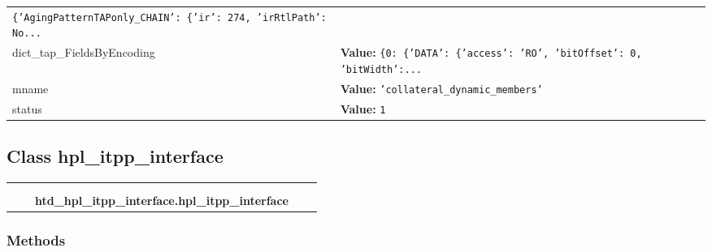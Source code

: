 \begin{longtable}{|p{\varnamewidth}|p{\vardescrwidth}|l}
{\tt \texttt{\{}\texttt{'}\texttt{AgingPatternTAPonly\_CHAIN}\texttt{'}\texttt{: }\texttt{\{}\texttt{'}\texttt{ir}\texttt{'}\texttt{: }274\texttt{, }\texttt{'}\texttt{irRtlPath}\texttt{'}\texttt{: }No\texttt{...}}&\\
\cline{1-2}
\raggedright d\-i\-c\-t\-\_\-t\-a\-p\-\_\-F\-i\-e\-l\-d\-s\-B\-y\-E\-n\-c\-o\-d\-i\-n\-g\- & \raggedright \textbf{Value:} 
{\tt \texttt{\{}0\texttt{: }\texttt{\{}\texttt{'}\texttt{DATA}\texttt{'}\texttt{: }\texttt{\{}\texttt{'}\texttt{access}\texttt{'}\texttt{: }\texttt{'}\texttt{RO}\texttt{'}\texttt{, }\texttt{'}\texttt{bitOffset}\texttt{'}\texttt{: }0\texttt{, }\texttt{'}\texttt{bitWidth}\texttt{'}\texttt{:}\texttt{...}}&\\
\cline{1-2}
\raggedright m\-n\-a\-m\-e\- & \raggedright \textbf{Value:} 
{\tt \texttt{'}\texttt{collateral\_dynamic\_members}\texttt{'}}&\\
\cline{1-2}
\raggedright s\-t\-a\-t\-u\-s\- & \raggedright \textbf{Value:} 
{\tt 1}&\\
\cline{1-2}
\end{longtable}



\subsection{Class hpl\_itpp\_interface}

    \label{htd_hpl_itpp_interface:hpl_itpp_interface}
\begin{tabular}{cccccc}
\multicolumn{2}{r}{\settowidth{\BCL}{object}\multirow{2}{\BCL}{object}}
&&
  \\\cline{3-3}
  &&\multicolumn{1}{c|}{}
&&
  \\
&&\multicolumn{2}{l}{\textbf{htd\_hpl\_itpp\_interface.hpl\_itpp\_interface}}
\end{tabular}



  \subsubsection{Methods}

